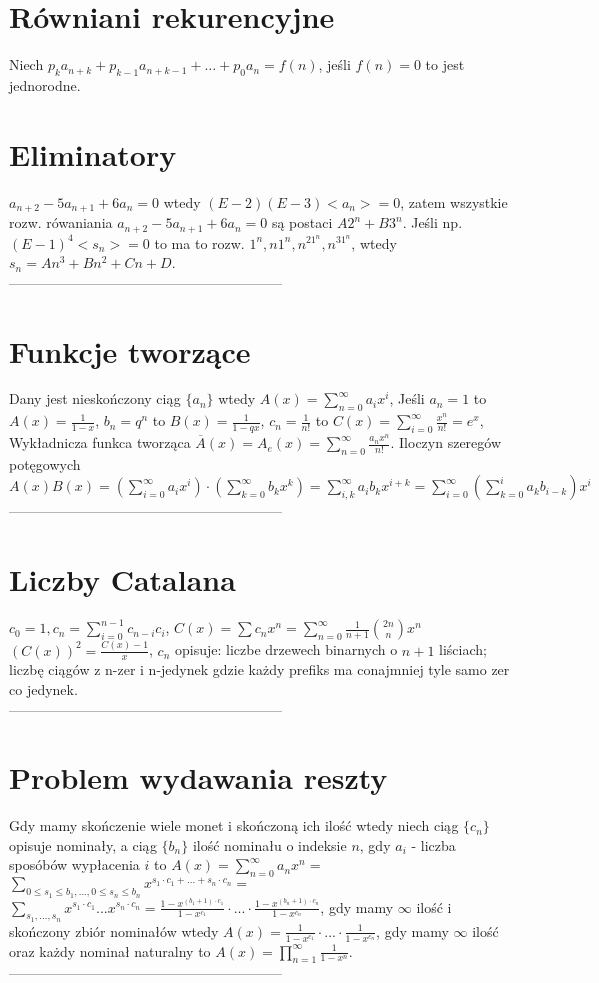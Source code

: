 \documentclass{article}
\begin{document}
\begin{minipage}[t]{.33\textwidth}
\section*{Równiani rekurencyjne}
Niech $p_ka_{n+k} + p_{k-1}a_{n+k-1} + … + p_0a_n = f(n)$, jeśli $f(n) = 0$ to jest jednorodne.
\section*{Eliminatory}
$a_{n+2} - 5a_{n+1} + 6a_n = 0$ wtedy $(E-2)(E-3)<a_n>=0$, zatem wszystkie rozw. rówaniania $a_{n+2} - 5a_{n+1} + 6a_n = 0$ są postaci $A2^n + B3^n$.
Jeśli np. $(E-1)^4<s_n> = 0$ to ma to rozw. $1^n, n1^n, n^21^n,n^31^n$, wtedy $s_n = An^3 + Bn^2 + Cn + D$.\\
-----------------------------------------------------------
\section*{Funkcje tworzące}
Dany jest nieskończony ciąg $\{a_n\}$ wtedy $A(x) = \sum_{n=0}^{\infty}a_ix^i$, Jeśli $a_n = 1$ to $A(x) = \frac{1}{1-x}$, $b_n = q^n$ to $B(x)  = \frac{1}{1-qx}$, $c_n = \frac{1}{n!}$ to $C(x) = \sum_{i=0}^{\infty} \frac{x^n}{n!} = e^x$, Wykładnicza funkca tworząca $\overline{A}(x) = A_e(x) = \sum_{n=0}^\infty \frac{a_nx^n}{n!}$. Iloczyn szeregów potęgowych $A(x)B(x) = \left(\sum_{i=0}^\infty a_i x^i\right)\cdot\left(\sum_{k=0}^\infty b_k x^k\right) = \sum_{i,k}^\infty a_ib_k x^{i+k} = \sum_{i=0}^\infty\left(\sum_{k=0}^{i} a_kb_{i-k} \right)x^i$ \\
-----------------------------------------------------------
\section*{Liczby Catalana}
$c_0 = 1, c_n = \sum_{i=0}^{n-1}c_{n-i}c_i$, $C(x) = \sum c_n x^n = \sum_{n=0}^{\infty} \frac{1}{n+1}\binom{2n}{n}x^n$ $(C(x))^2 = \frac{C(x)-1}{x}$, $c_n$ opisuje: liczbe drzewech binarnych o $n+1$ liściach; liczbę ciągów z n-zer i n-jedynek gdzie każdy prefiks ma conajmniej tyle samo zer co jedynek.\\
-----------------------------------------------------------
\section*{Problem wydawania reszty}
Gdy mamy skończenie wiele monet i skończoną ich ilość wtedy niech ciąg $\{c_n\}$ opisuje nominały, a ciąg $\{b_n\}$ ilość nominału o indeksie $n$, gdy $a_i$ - liczba sposóbów wypłacenia $i$ to $A(x) = \sum_{n=0}^\infty a_nx^n =$ $ \sum_{0\leq s_1 \leq b_1, ... ,0 \leq s_n \leq b_n}x^{s_1\cdot c_1 + ... + s_n \cdot c_n} =$ $ \sum_{s_1,...,s_n}x^{s_1\cdot c_1}...x^{s_n\cdot c_n}= \frac{1-x^{(b_1+1)\cdot c_1}}{1-x^{c_1}}\cdot ... \cdot \frac{1-x^{(b_n+1)\cdot c_n}}{1-x^{c_n}}$, gdy mamy $\infty$ ilość i skończony zbiór nominałów wtedy $A(x) = \frac{1}{1-x^{c_1}}\cdot...\cdot\frac{1}{1-x^{c_n}}$, gdy mamy $\infty$ ilość oraz każdy nominał naturalny to $A(x) = \prod_{n=1}^\infty\frac{1}{1-x^n}$.\\
-----------------------------------------------------------

\end{minipage}
\end{document}

